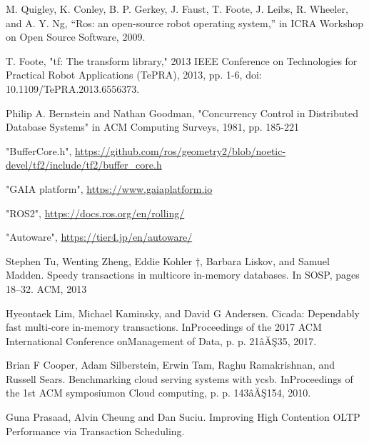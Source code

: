 \documentclass[a4paper]{jreport}	%
\begin{document}
\newpage
{}
\renewcommand{\bibname}{参考文献}


%
%

	
\begin{thebibliography}{99}


 M. Quigley, K. Conley, B. P. Gerkey, J. Faust, T. Foote, J. Leibs, R. Wheeler, and A. Y. Ng, “Ros: an open-source robot operating system,” in ICRA Workshop on Open Source Software, 2009.

 T. Foote, "tf: The transform library," 2013 IEEE Conference on Technologies for Practical Robot Applications (TePRA), 2013, pp. 1-6, doi: 10.1109/TePRA.2013.6556373.

 Philip A. Bernstein and Nathan Goodman, "Concurrency Control in Distributed Database Systems" in ACM Computing Surveys, 1981, pp. 185-221

 "BufferCore.h", \url{https://github.com/ros/geometry2/blob/noetic-devel/tf2/include/tf2/buffer_core.h}

 "GAIA platform", \url{https://www.gaiaplatform.io}

 "ROS2", \url{https://docs.ros.org/en/rolling/}

 "Autoware", \url{https://tier4.jp/en/autoware/}

 Stephen Tu, Wenting Zheng, Eddie Kohler †, Barbara Liskov,
and Samuel Madden. Speedy transactions in multicore in-memory
databases. In SOSP, pages 18–32. ACM, 2013

 Hyeontaek Lim, Michael Kaminsky, and David G Andersen. Cicada: Dependably fast multi-core in-memory transactions. InProceedings of the 2017 ACM International Conference onManagement of Data, p. p. 21âĂŞ35, 2017.

 Brian F Cooper, Adam Silberstein, Erwin Tam, Raghu Ramakrishnan, and Russell Sears. Benchmarking cloud serving systems with ycsb. InProceedings of the 1st ACM symposiumon Cloud computing, p. p. 143âĂŞ154, 2010.

 Guna Prasaad, Alvin Cheung and Dan Suciu. Improving High Contention OLTP Performance via Transaction Scheduling. 


\end{thebibliography}
\end{document}
